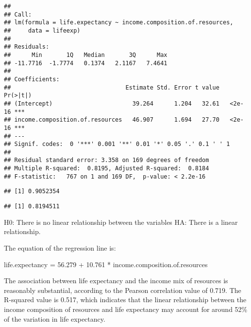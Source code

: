 \documentclass[
]{article}
\newenvironment{Shaded}{\begin{snugshade}}{\end{snugshade}}
\newcommand{\FunctionTok}[1]{\textcolor[rgb]{0.00,0.00,0.00}{#1}}
\newcommand{\NormalTok}[1]{#1}
\newcommand{\SpecialCharTok}[1]{\textcolor[rgb]{0.00,0.00,0.00}{#1}}
\begin{document}
\begin{verbatim}
## 
## Call:
## lm(formula = life.expectancy ~ income.composition.of.resources, 
##     data = lifeexp)
## 
## Residuals:
##      Min       1Q   Median       3Q      Max 
## -11.7716  -1.7774   0.1374   2.1167   7.4641 
## 
## Coefficients:
##                                 Estimate Std. Error t value Pr(>|t|)    
## (Intercept)                       39.264      1.204   32.61   <2e-16 ***
## income.composition.of.resources   46.907      1.694   27.70   <2e-16 ***
## ---
## Signif. codes:  0 '***' 0.001 '**' 0.01 '*' 0.05 '.' 0.1 ' ' 1
## 
## Residual standard error: 3.358 on 169 degrees of freedom
## Multiple R-squared:  0.8195, Adjusted R-squared:  0.8184 
## F-statistic:   767 on 1 and 169 DF,  p-value: < 2.2e-16
\end{verbatim}

\begin{Shaded}
\end{Shaded}

\begin{verbatim}
## [1] 0.9052354
\end{verbatim}

\begin{Shaded}
\end{Shaded}

\begin{verbatim}
## [1] 0.8194511
\end{verbatim}

H0: There is no linear relationship between the variables HA: There is a
linear relationship.

The equation of the regression line is:

life.expectancy = 56.279 + 10.761 * income.composition.of.resources

The association between life expectancy and the income mix of resources
is reasonably substantial, according to the Pearson correlation value of
0.719. The R-squared value is 0.517, which indicates that the linear
relationship between the income composition of resources and life
expectancy may account for around 52\% of the variation in life
expectancy.
\end{document}
